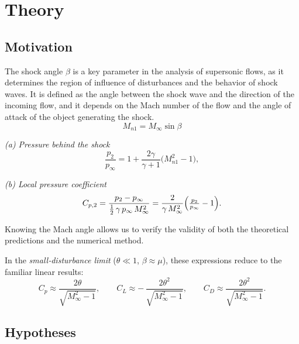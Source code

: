 \newpage

\section{Theory}
\label{sec:theory}

\subsection{Motivation}
\label{subsec:motivation}

The shock angle \(\beta\) is a key parameter in the analysis of supersonic flows, as it determines the region of influence of disturbances and the behavior of shock waves. It is defined as the angle between the shock wave and the direction of the incoming flow, and it depends on the Mach number of the flow and the angle of attack of the object generating the shock.
\begin{equation}
    M_{n1} = M_\infty \sin\beta
\end{equation}
\vspace{4pt}
\begin{minipage}{0.48\linewidth}
\textit{(a) Pressure behind the shock}
\[
    \frac{p_2}{p_\infty}
    = 1 + \frac{2\gamma}{\gamma + 1}\bigl(M_{n1}^2 - 1\bigr),
\]
\end{minipage}
\hfill
\begin{minipage}{0.48\linewidth}
\textit{(b) Local pressure coefficient}
\[
    C_{p,2}
    = \frac{p_2 - p_\infty}{\tfrac{1}{2}\,\gamma\,p_\infty\,M_\infty^2}
    = \frac{2}{\gamma\,M_\infty^{2}}
    \Bigl(\tfrac{p_2}{p_\infty} - 1\Bigr).
\]
\end{minipage}

Knowing the Mach angle allows us to verify the validity of both the theoretical predictions and the numerical method.

In the \emph{small‐disturbance limit} (\(\theta \ll 1\), \(\beta \approx \mu\)), these expressions reduce to the familiar linear results:
\[
    C_p \approx \frac{2\theta}{\sqrt{M_\infty^{2} - 1}},
    \qquad
    C_L \approx -\,\frac{2\theta^{2}}{\sqrt{M_\infty^{2} - 1}},
    \qquad
    C_D \approx \frac{2\theta^{2}}{\sqrt{M_\infty^{2} - 1}}.
\]

\subsection{Hypotheses}
\label{subsec:hypotheses}


